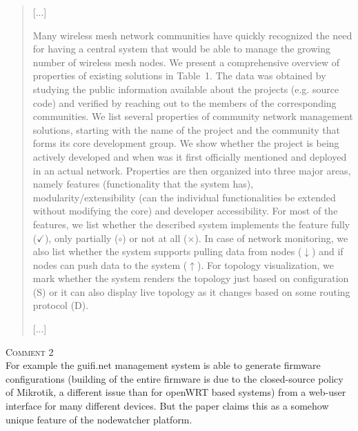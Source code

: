 \documentclass[12pt,twoside,a4paper]{report}
\begin{document}
\begin{quote}

[...]

\newcommand{\push}{$\uparrow$}
\newcommand{\pull}{$\downarrow$}

\newcommand{\no}{$\times$}
\newcommand{\yes}{$\checkmark$}
\newcommand{\maybe}{$\circ$}

\newcommand{\static}{S}
\newcommand{\dynamic}{D}

Many wireless mesh network communities have quickly recognized the need for having a central system that would be able to manage the growing number of wireless mesh nodes.
We present a comprehensive overview of properties of existing solutions in Table~1. The data was obtained by studying the public information available about the projects (e.g. source code) and verified by reaching out to the members of the corresponding communities.
We list several properties of community network management solutions, starting with the name of the project and the community that forms its core development group.
We show whether the project is being actively developed and when was it first officially mentioned and deployed in an actual network.
Properties are then organized into three major areas, namely  features (functionality that the system has), modularity/extensibility (can the individual functionalities be extended without modifying the core) and developer accessibility.
For most of the features, we list whether the described system implements the feature fully (\yes), only partially (\maybe) or not at all (\no).
In case of network monitoring, we also list whether the system supports pulling data from nodes (\pull) and if nodes can push data to the system (\push).
For topology visualization, we mark whether the system renders the topology just based on configuration (\static) or it can also display live topology as it changes based on some routing protocol (\dynamic).

[...]

\end{quote}

\vspace{0.5cm}\noindent\textsc{Comment 2}\\
For example the guifi.net management system is able to generate firmware configurations (building of the entire firmware is due to the closed-source policy of Mikrotik, a different issue than for openWRT based systems) from a web-user interface for many different devices. But the paper claims this as a somehow unique feature of the nodewatcher platform. 
\end{document}
